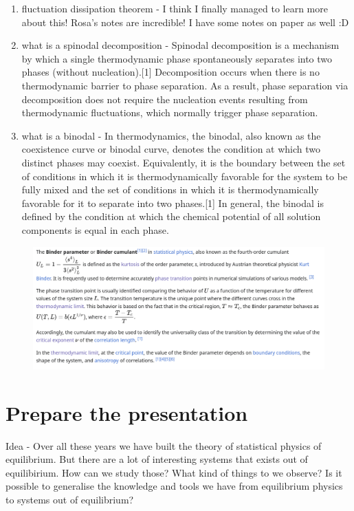 \documentclass[a4paper]{article}
\begin{document}
\begin{enumerate}
	\item fluctuation dissipation theorem - I think I finally managed to learn more about this! Rosa's notes are incredible! I have some notes on paper as well :D
	\item what is a spinodal decomposition - Spinodal decomposition is a mechanism by which a single thermodynamic phase spontaneously separates into two phases (without nucleation).[1] Decomposition occurs when there is no thermodynamic barrier to phase separation. As a result, phase separation via decomposition does not require the nucleation events resulting from thermodynamic fluctuations, which normally trigger phase separation. 
	\item what is a binodal - In thermodynamics, the binodal, also known as the coexistence curve or binodal curve, denotes the condition at which two distinct phases may coexist. Equivalently, it is the boundary between the set of conditions in which it is thermodynamically favorable for the system to be fully mixed and the set of conditions in which it is thermodynamically favorable for it to separate into two phases.[1] In general, the binodal is defined by the condition at which the chemical potential of all solution components is equal in each phase.
\end{enumerate}

\begin{figure}[H]
	\centering
	\includegraphics[width=\textwidth]{binder-cumulant.png}
\end{figure}

\section{Prepare the presentation}

Idea - Over all these years we have built the theory of statistical physics of equilibrium. But there are a lot of interesting systems that exists out of equilibirium. How can we study those? What kind of things to we observe? Is it possible to generalise the knowledge and tools we have from equilibrium physics to systems out of equilibrium?
\end{document}
